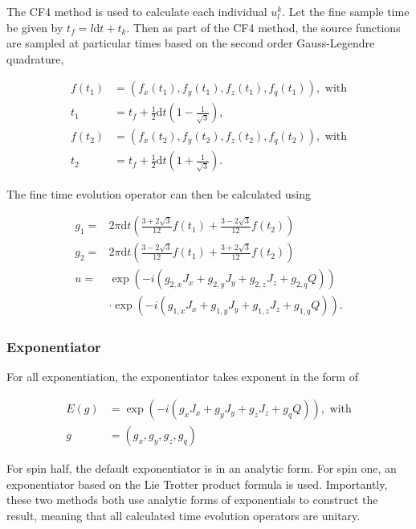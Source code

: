 \documentclass{jors}
\begin{document}
			The CF4 method is used to calculate each individual \(u^k_l\). Let the fine sample time be given by \(t_f = l\mathrm{d}t + t_k\). Then as part of the CF4 method, the source functions are sampled at particular times based on the second order Gauss-Legendre quadrature,
			
			\begin{align*}
				f(t_1) &= (f_x(t_1), f_y(t_1), f_z(t_1), f_q(t_1)), \textrm{ with}\\
				t_1 &= t_f + \frac12 \mathrm{d}t\left(1 - \frac{1}{\sqrt{3}}\right),\\
				f(t_2) &= (f_x(t_2), f_y(t_2), f_z(t_2), f_q(t_2)), \textrm{ with}\\
				t_2 &= t_f + \frac12 \mathrm{d}t\left(1 + \frac{1}{\sqrt{3}}\right).
			\end{align*}
			
			The fine time evolution operator can then be calculated using
			
			\begin{align*}
				g_1 =& 2 \pi \mathrm{d}t \left(\frac{3 + 2 \sqrt{3}}{12} f(t_1) + \frac{3 - 2 \sqrt{3}}{12} f(t_2)\right)\\
				g_2 =& 2 \pi \mathrm{d}t \left(\frac{3 - 2 \sqrt{3}}{12} f(t_1) + \frac{3 + 2 \sqrt{3}}{12} f(t_2)\right)\\
				u =& \exp(-i \left( g_{2,x} J_x + g_{2,y} J_y + g_{2,z} J_z + g_{2,q} Q\right))\\
				&\cdot\exp(-i \left( g_{1,x} J_x + g_{1,y} J_y + g_{1,z} J_z + g_{1,q} Q\right)).
			\end{align*}

		\subsubsection*{Exponentiator}
			For all exponentiation, the exponentiator takes exponent in the form of
			
			\begin{align*}
				E(g) &= \exp(-i (g_x J_x + g_y J_y + g_z J_z + g_q Q)), \textrm{ with}\\
				g &= (g_x, g_y, g_z, g_q)
			\end{align*}
			
			For spin half, the default exponentiator is in an analytic form. For spin one, an exponentiator based on the Lie Trotter product formula \cite{moler_nineteen_2003} is used. Importantly, these two methods both use analytic forms of exponentials to construct the result, meaning that all calculated time evolution operators are unitary.
\end{document}
